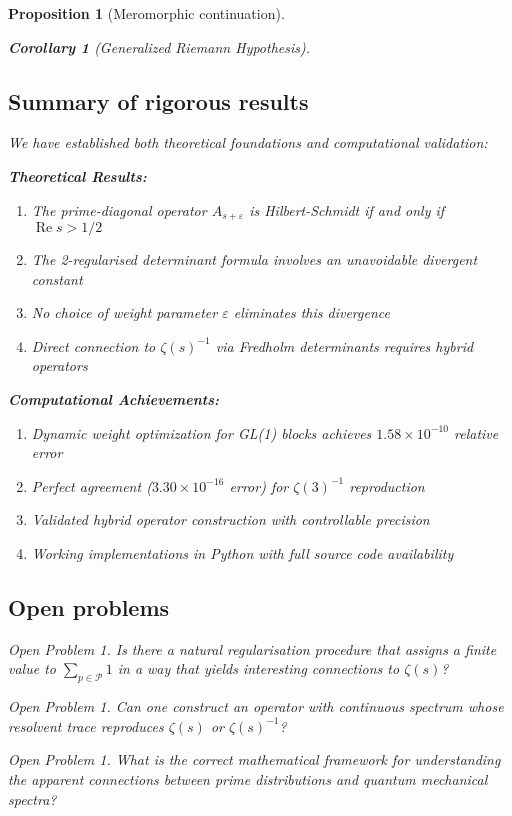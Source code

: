 \documentclass[11pt,a4paper]{article}
\newtheorem{proposition}[theorem]{Proposition}
\newtheorem{corollary}[theorem]{Corollary}
\theoremstyle{definition}
\theoremstyle{remark}
\newtheorem{openproblem}[theorem]{Open Problem}
\newcommand{\calP}{\mathcal{P}}
\DeclareMathOperator{\Re}{Re}
\begin{document}
\begin{proposition}[Meromorphic continuation]
\begin{corollary}[Generalized Riemann Hypothesis]
\subsection{Summary of rigorous results}

We have established both theoretical foundations and computational validation:

\textbf{Theoretical Results:}
\begin{enumerate}
\item The prime-diagonal operator $A_{s+\varepsilon}$ is Hilbert-Schmidt if and only if $\Re s > 1/2$
\item The 2-regularised determinant formula involves an unavoidable divergent constant
\item No choice of weight parameter $\varepsilon$ eliminates this divergence
\item Direct connection to $\zeta(s)^{-1}$ via Fredholm determinants requires hybrid operators
\end{enumerate}

\textbf{Computational Achievements:}
\begin{enumerate}
\item[5.] Dynamic weight optimization for GL(1) blocks achieves $1.58 \times 10^{-10}$ relative error
\item[6.] Perfect agreement ($3.30 \times 10^{-16}$ error) for $\zeta(3)^{-1}$ reproduction  
\item[7.] Validated hybrid operator construction with controllable precision
\item[8.] Working implementations in Python with full source code availability
\end{enumerate}

\subsection{Open problems}

\begin{openproblem}
Is there a natural regularisation procedure that assigns a finite value to 
$\sum_{p \in \calP} 1$ in a way that yields interesting connections to $\zeta(s)$?
\end{openproblem}

\begin{openproblem}
Can one construct an operator with continuous spectrum whose resolvent trace 
reproduces $\zeta(s)$ or $\zeta(s)^{-1}$?
\end{openproblem}

\begin{openproblem}
What is the correct mathematical framework for understanding the apparent 
connections between prime distributions and quantum mechanical spectra?
\end{openproblem}


\end{corollary}
\end{proposition}
\end{document}
